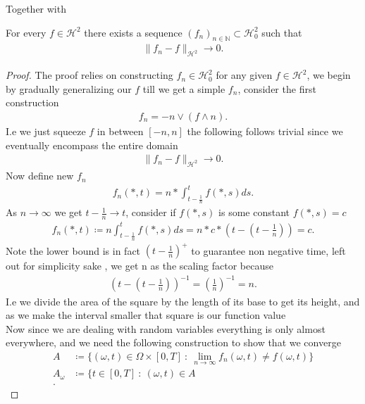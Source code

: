 Together with
\begin{prop}
  For every $f \in  \mathcal{H}^2$  there exists a sequence $(f_n)_{n\in \mathbb{N}} \subset  \mathcal{H}_0^{2} $  such that 
  \begin{align*}
    \|f_n - f\|_{\mathcal{H}^2} \to  0
  .\end{align*}
\end{prop}
\begin{proof}
 The proof relies on constructing $f_n \in  \mathcal{H}^2_0$  for any given $f \in  \mathcal{H}^2$, we begin by gradually 
 generalizing our $f$ till we get a simple $f_n$, consider the first construction 
 \begin{align*}
  f_n = -n \lor (f \land n)
 .\end{align*}
 I.e we just squeeze $f$ in between $[-n,n]$ the following follows trivial since we eventually encompass the entire domain 
 \begin{align*}
   \|f_n - f\|_{\mathcal{H}^2} \to  0
 .\end{align*}
  Now define new $f_n$
  \begin{align*}
    f_n(*,t) = n*\int_{t-\frac{1}{n}}^{t}  f(*,s) ds
  .\end{align*}
  As $n \to  \infty$  we get  $t - \frac{1}{n} \to  t$, consider if $f(*,s)$ is some constant $f(*,s) = c$  
  \begin{align*}
    f_n(*,t) \coloneqq  n \int_{t-\frac{1}{n}}^{t} f(*,s) ds =  n*c*(t-(t-\frac{1}{n})) = c
  .\end{align*}
  Note the lower bound is in fact $(t-\frac{1}{n})^{+} $ to guarantee non negative time, left out for simplicity sake , we get n as the scaling factor because 
  \begin{align*}
    (t-(t-\frac{1}{n}))^{-1}  = (\frac{1}{n})^{-1} = n 
  .\end{align*}
  I.e we divide the area of the square by the length of its base to get its height, and as we make the interval smaller that square is our function value\\[1ex]
  Now since we are dealing with random variables everything is only almost everywhere, and we need the following construction to show that we converge 
  \begin{align*}
    A &\coloneqq  \{(\omega ,t) \in  \Omega  \times  [0,T] \ : \ \lim_{n \to \infty} f_n(\omega ,t) \neq  f(\omega ,t)\}  \\
    A_\omega  &\coloneqq  \{t \in [0,T] \ : \ (\omega ,t) \in  A  \\
  .\end{align*}

\end{proof}
